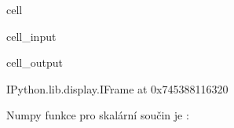 \documentclass[letterpaper,10pt,english]{jupyterBook}
\begin{document}
\begin{sphinxuseclass}{cell}\begin{sphinxVerbatimInput}

\begin{sphinxuseclass}{cell_input}
\begin{sphinxVerbatim}[commandchars=\\\{\}]
        
\end{sphinxVerbatim}

\end{sphinxuseclass}\end{sphinxVerbatimInput}
\begin{sphinxVerbatimOutput}

\begin{sphinxuseclass}{cell_output}
\begin{sphinxVerbatim}[commandchars=\\\{\}]
\PYGZlt{}IPython.lib.display.IFrame at 0x745388116320\PYGZgt{}
\end{sphinxVerbatim}

\end{sphinxuseclass}\end{sphinxVerbatimOutput}

\end{sphinxuseclass}
\sphinxAtStartPar
Numpy funkce pro skalární součin je :
\end{document}

